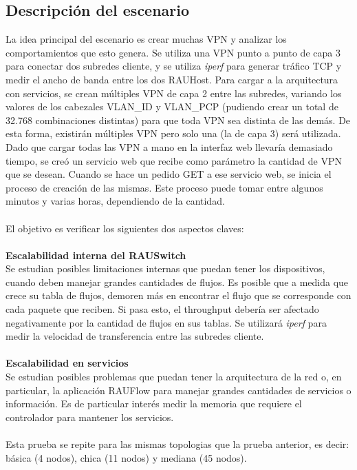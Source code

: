 \subsection{Descripción del escenario}
La idea principal del escenario es crear muchas VPN y analizar los comportamientos que esto genera. Se utiliza una VPN punto a punto de capa 3 para conectar dos subredes cliente, y se utiliza \textit{iperf} para generar tráfico TCP y medir el ancho de banda entre los dos RAUHost. Para cargar a la arquitectura con servicios, se crean múltiples VPN de capa 2 entre las subredes, variando los valores de los cabezales VLAN\_ID y VLAN\_PCP (pudiendo crear un total de 32.768 combinaciones distintas) para que toda VPN sea distinta de las demás. De esta forma, existirán múltiples VPN pero solo una (la de capa 3) será utilizada. \\
Dado que cargar todas las VPN a mano en la interfaz web llevaría demasiado tiempo, se creó un servicio web que recibe como parámetro la cantidad de VPN que se desean. Cuando se hace un pedido GET a ese servicio web, se inicia el proceso de creación de las mismas. Este proceso puede tomar entre algunos minutos y varias horas, dependiendo de la cantidad. \\ \\
El objetivo es verificar los siguientes dos aspectos claves: \\ \\
\textbf{Escalabilidad interna del RAUSwitch} \\
Se estudian posibles limitaciones internas que puedan tener los dispositivos, cuando deben manejar grandes cantidades de flujos. Es posible que a medida que crece su tabla de flujos, demoren más en encontrar el flujo que se corresponde con cada paquete que reciben. Si pasa esto, el throughput debería ser afectado negativamente por la cantidad de flujos en sus tablas. Se utilizará \textit{iperf} para medir la velocidad de transferencia entre las subredes cliente.  \\ \\
\textbf{Escalabilidad en servicios} \\
Se estudian posibles problemas que puedan tener la arquitectura de la red o, en particular, la aplicación RAUFlow para manejar grandes cantidades de servicios o información. Es de particular interés medir la memoria que requiere el controlador para mantener los servicios. \\ \\
Esta prueba se repite para las mismas topologias que la prueba anterior, es decir: básica (4 nodos), chica (11 nodos) y mediana (45 nodos).

